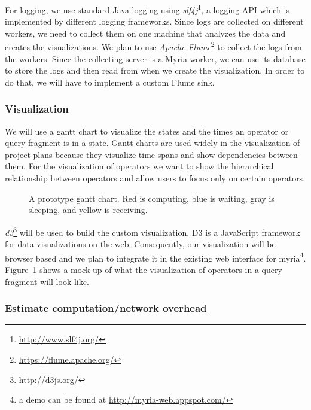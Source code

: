 \documentclass[11pt]{article}
\begin{document}

For logging, we use standard Java logging using \emph{slf4j}\footnote{\url{http://www.slf4j.org/}}, a logging API which is implemented by different logging frameworks. Since logs are collected on different workers, we need to collect them on one machine that analyzes the data and creates the visualizations. We plan to use \emph{Apache Flume}\footnote{\url{https://flume.apache.org/}} to collect the logs from the workers. Since the collecting server is a Myria worker, we can use its database to store the logs and then read from when we create the visualization. In order to do that, we will have to implement a custom Flume sink.


	\subsubsection*{Visualization}

	We will use a gantt chart to visualize the states and the times an operator or query fragment is in a state. Gantt charts are used widely in the visualization of project plans because they visualize time spans and show dependencies between them. For the visualization of operators we want to show the hierarchical relationship between operators and allow users to focus only on certain operators.

\begin{figure}[h]
  \begin{center}
    \def\svgwidth{0.9\columnwidth}
    
  \end{center}
  \caption{A prototype gantt chart. Red is computing, blue is waiting, gray is sleeping, and yellow is receiving.}
  \label{fig:gantt}
\end{figure}

	\emph{d3}\footnote{\url{http://d3js.org/}} will be used to build the custom visualization. D3 is a JavaScript framework for data visualizations on the web. Consequently, our visualization will be browser based and we plan to integrate it in the existing web interface for myria\footnote{a demo can be found at \url{http://myria-web.appspot.com/}}. Figure~\ref{fig:gantt} shows a mock-up of what the visualization of operators in a query fragment will look like. 

	\subsubsection*{Estimate computation/network overhead}

\end{document}
